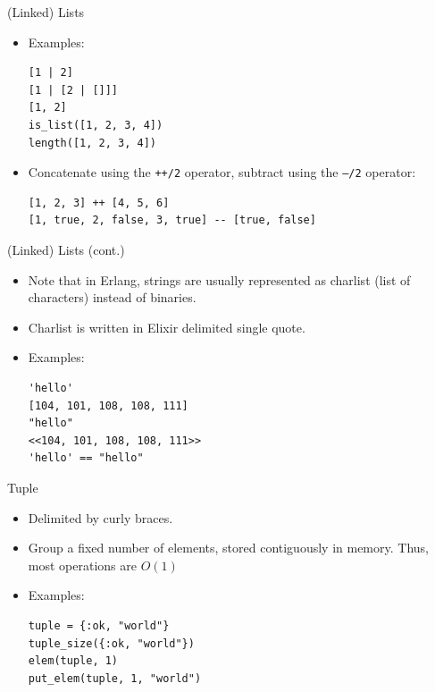 \documentclass[12pt]{beamer}
\begin{document}
\begin{frame}[fragile]{(Linked) Lists}
  \begin{itemize}
    \item Examples:
          \begin{verbatim}
[1 | 2]
[1 | [2 | []]]
[1, 2]
is_list([1, 2, 3, 4])
length([1, 2, 3, 4])
        \end{verbatim}
    \item Concatenate using the \texttt{++/2} operator, subtract using the \texttt{--/2} operator:
          \begin{verbatim}
[1, 2, 3] ++ [4, 5, 6]
[1, true, 2, false, 3, true] -- [true, false]
        \end{verbatim}
  \end{itemize}
\end{frame}

\begin{frame}[fragile]{(Linked) Lists (cont.)}
  \begin{itemize}
    \item Note that in Erlang, strings are usually represented as charlist (list of characters) instead of binaries.
    \item Charlist is written in Elixir delimited single quote.
    \item Examples:
          \begin{verbatim}
'hello'
[104, 101, 108, 108, 111]
"hello"
<<104, 101, 108, 108, 111>>
'hello' == "hello"
        \end{verbatim}
  \end{itemize}
\end{frame}

\begin{frame}[fragile]{Tuple}
  \begin{itemize}
    \item Delimited by curly braces.
    \item Group a fixed number of elements, stored contiguously in memory. Thus, most operations are $O(1)$
    \item Examples:
          \begin{verbatim}
tuple = {:ok, "world"}
tuple_size({:ok, "world"})
elem(tuple, 1)
put_elem(tuple, 1, "world")
      \end{verbatim}
  \end{itemize}
\end{frame}
\end{document}
